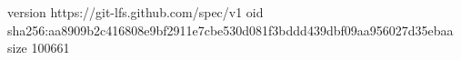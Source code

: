 version https://git-lfs.github.com/spec/v1
oid sha256:aa8909b2c416808e9bf2911e7cbe530d081f3bddd439dbf09aa956027d35ebaa
size 100661
